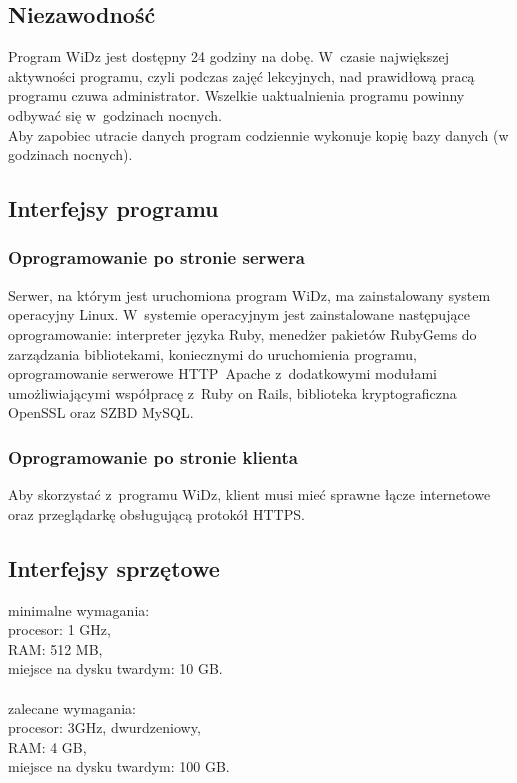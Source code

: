 \documentclass[12pt,leqno,twoside]{mwart}
\begin{document}
\subsection{Niezawodność}
\noindent Program WiDz jest dostępny 24 godziny na dobę. W~czasie największej aktywności programu, czyli podczas zajęć lekcyjnych, nad prawidłową pracą programu czuwa administrator. Wszelkie uaktualnienia programu powinny odbywać się w~godzinach nocnych.\\
\indent Aby zapobiec utracie danych program codziennie wykonuje kopię bazy danych (w godzinach nocnych).

\subsection{Interfejsy programu}
\subsubsection{Oprogramowanie po stronie serwera}
\noindent Serwer, na którym jest uruchomiona program WiDz, ma zainstalowany system operacyjny Linux. W~systemie operacyjnym jest zainstalowane następujące oprogramowanie: interpreter języka Ruby, menedżer pakietów RubyGems do zarządzania bibliotekami, koniecznymi do uruchomienia programu, oprogramowanie serwerowe HTTP~Apache z~dodatkowymi modułami umożliwiającymi współpracę z~Ruby on Rails, biblioteka kryptograficzna OpenSSL oraz SZBD MySQL.

\subsubsection{Oprogramowanie po stronie klienta}
\noindent Aby skorzystać z~programu WiDz, klient musi mieć sprawne łącze internetowe oraz przeglądarkę obsługującą protokół HTTPS.

\subsection{Interfejsy sprzętowe}
\noindent minimalne wymagania:\\
	\indent procesor: 1 GHz, \\
	\indent RAM: 512 MB, \\
	\indent miejsce na dysku twardym: 10 GB. \\
\noindent \\
\noindent zalecane wymagania: \\
	\indent procesor: 3GHz, dwurdzeniowy, \\
	\indent RAM: 4 GB, \\ 
	\indent miejsce na dysku twardym: 100 GB. \\
\end{document}
